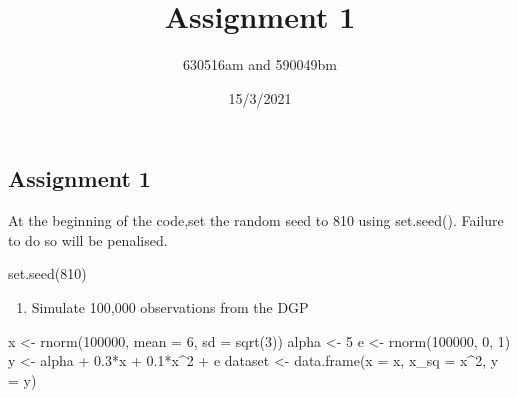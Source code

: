 \documentclass[
]{article}
\title{Assignment 1}
\author{630516am and 590049bm}
\date{15/3/2021}
\newenvironment{Shaded}{\begin{snugshade}}{\end{snugshade}}
\newcommand{\AttributeTok}[1]{\textcolor[rgb]{0.77,0.63,0.00}{#1}}
\newcommand{\DecValTok}[1]{\textcolor[rgb]{0.00,0.00,0.81}{#1}}
\newcommand{\FloatTok}[1]{\textcolor[rgb]{0.00,0.00,0.81}{#1}}
\newcommand{\FunctionTok}[1]{\textcolor[rgb]{0.00,0.00,0.00}{#1}}
\newcommand{\NormalTok}[1]{#1}
\newcommand{\OtherTok}[1]{\textcolor[rgb]{0.56,0.35,0.01}{#1}}
\newcommand{\SpecialCharTok}[1]{\textcolor[rgb]{0.00,0.00,0.00}{#1}}
\providecommand{\tightlist}{%
  \setlength{\itemsep}{0pt}\setlength{\parskip}{0pt}}
\begin{document}
\maketitle

\hypertarget{assignment-1}{%
\subsection{Assignment 1}\label{assignment-1}}

At the beginning of the code,set the random seed to 810 using
set.seed(). Failure to do so will be penalised.

\small

\begin{Shaded}
\begin{Highlighting}[]
\FunctionTok{set.seed}\NormalTok{(}\DecValTok{810}\NormalTok{)}
\end{Highlighting}
\end{Shaded}

\normalsize

\begin{enumerate}
\def\labelenumi{\alph{enumi}.}
\tightlist
\item
  Simulate 100,000 observations from the DGP
\end{enumerate}

\small

\begin{Shaded}
\begin{Highlighting}[]
\NormalTok{x }\OtherTok{\textless{}{-}} \FunctionTok{rnorm}\NormalTok{(}\DecValTok{100000}\NormalTok{, }\AttributeTok{mean =} \DecValTok{6}\NormalTok{, }\AttributeTok{sd =} \FunctionTok{sqrt}\NormalTok{(}\DecValTok{3}\NormalTok{))}
\NormalTok{alpha }\OtherTok{\textless{}{-}} \DecValTok{5}
\NormalTok{e }\OtherTok{\textless{}{-}} \FunctionTok{rnorm}\NormalTok{(}\DecValTok{100000}\NormalTok{, }\DecValTok{0}\NormalTok{, }\DecValTok{1}\NormalTok{)}
\NormalTok{y }\OtherTok{\textless{}{-}}\NormalTok{ alpha }\SpecialCharTok{+} \FloatTok{0.3}\SpecialCharTok{*}\NormalTok{x }\SpecialCharTok{+} \FloatTok{0.1}\SpecialCharTok{*}\NormalTok{x}\SpecialCharTok{\^{}}\DecValTok{2} \SpecialCharTok{+}\NormalTok{ e}
\NormalTok{dataset }\OtherTok{\textless{}{-}} \FunctionTok{data.frame}\NormalTok{(}\AttributeTok{x =}\NormalTok{ x, }\AttributeTok{x\_sq =}\NormalTok{ x}\SpecialCharTok{\^{}}\DecValTok{2}\NormalTok{, }\AttributeTok{y =}\NormalTok{ y)}
\end{Highlighting}
\end{Shaded}
\end{document}
